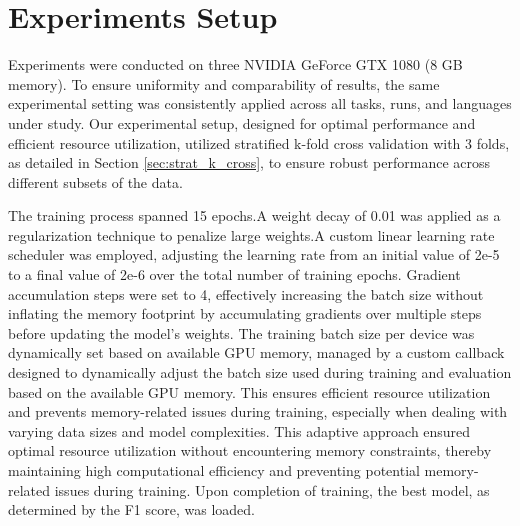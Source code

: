 \documentclass{Configuration_Files/PoliMi3i_thesis}
\begin{document}
\section{Experiments Setup} \label{sec:experiments_setup}
Experiments were conducted on three NVIDIA GeForce GTX 1080 (8 GB memory). To ensure uniformity and comparability of results, 
the same experimental setting was consistently applied across all tasks, runs, and languages under study. Our experimental setup, designed for optimal performance and efficient resource utilization, utilized stratified k-fold cross validation with 3 folds, as detailed in Section \ref{sec:strat_k_cross}, to ensure robust performance across different subsets of the data. 

The training process spanned 15 epochs.A weight decay of 0.01 was applied as a regularization technique to penalize large weights.A custom linear learning rate scheduler was employed, adjusting the learning rate from an initial value of 2e-5 to a final value of 2e-6 over the total number of training epochs. 
Gradient accumulation steps were set to 4, effectively increasing the batch size without inflating the memory footprint by accumulating gradients over multiple steps before updating the model's weights. 
The training batch size per device was dynamically set based on available GPU memory, managed by a custom callback designed to dynamically adjust the batch size used during training and evaluation based on the available GPU memory.
This ensures efficient resource utilization and prevents memory-related issues during training, especially when dealing with varying data sizes and model complexities. This adaptive approach ensured optimal resource utilization without encountering memory constraints, thereby maintaining high computational efficiency and preventing potential memory-related issues during training. Upon completion of training, the best model, as determined by the F1 score, was loaded. 
\end{document}
